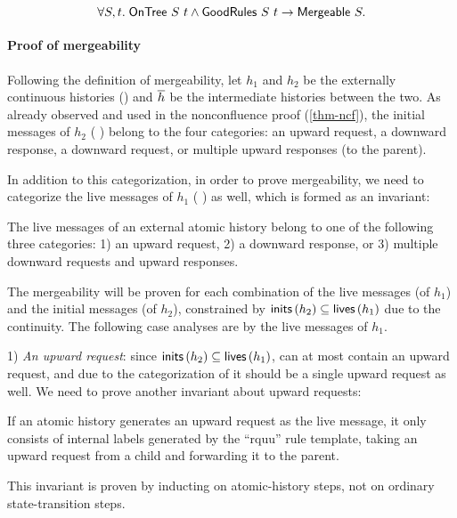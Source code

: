 \begin{theorem}
  \begin{displaymath}
    \forall S, t.\; \mathsf{OnTree}\ S\ t \land \mathsf{GoodRules}\ S\ t \to \mathsf{Mergeable}\ S.
  \end{displaymath}
  \vspace{-15pt}
  \label{thm-mgb}
\end{theorem}

\paragraph{Proof of mergeability}
Following the definition of mergeability, let $h_1$ and $h_2$ be the externally continuous histories () and $\overline{h}$ be the intermediate histories between the two.
As already observed and used in the nonconfluence proof (\autoref{thm-ncf}), the initial messages of $h_2$ (\ie{} ) belong to the four categories: an upward request, a downward response, a downward request, or multiple upward responses (to the parent).

In addition to this categorization, in order to prove mergeability, we need to categorize the live messages of $h_1$ (\ie{} ) as well, which is formed as an invariant:
\begin{invariant}\label{inv-live-msgs}
  The live messages of an external atomic history belong to one of the following three categories: 1) an upward request, 2) a downward response, or 3) multiple downward requests and upward responses.
\end{invariant}

The mergeability will be proven for each combination of the live messages (of $h_1$) and the initial messages (of $h_2$), constrained by $\mathsf{inits}\,(h_2) \subseteq \mathsf{lives}\,(h_1)$ due to the continuity.
The following case analyses are by the live messages of $h_1$.

1) \emph{An upward request}: since $\mathsf{inits}\,(h_2) \subseteq \mathsf{lives}\,(h_1)$,  can at most contain an upward request, and due to the categorization of  it should be a single upward request as well.
We need to prove another invariant about upward requests:
\begin{invariant}\label{inv-upward-rqs}
  If an atomic history generates an upward request as the live message, it only consists of internal labels generated by the ``rquu'' rule template, \ie{} taking an upward request from a child and forwarding it to the parent.
\end{invariant}
This invariant is proven by inducting on atomic-history steps, not on ordinary state-transition steps.

